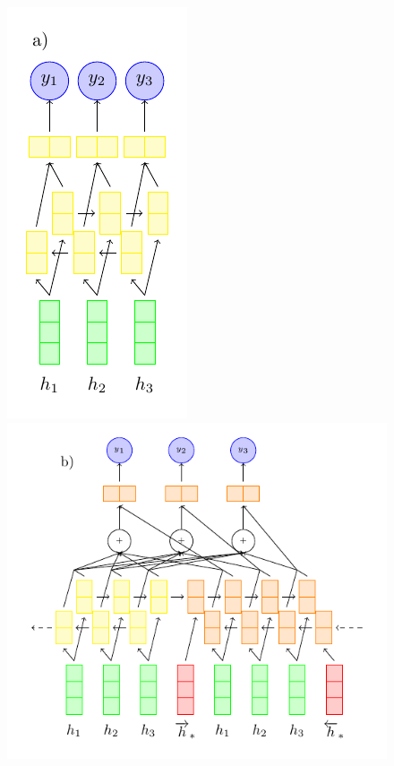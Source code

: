 \begin{figure}
  \center
  \includegraphics[scale=.65]{figures/rnnextractor.pdf}
  \includegraphics[scale=.65]{figures/s2s_extractor.pdf}

\end{figure}
